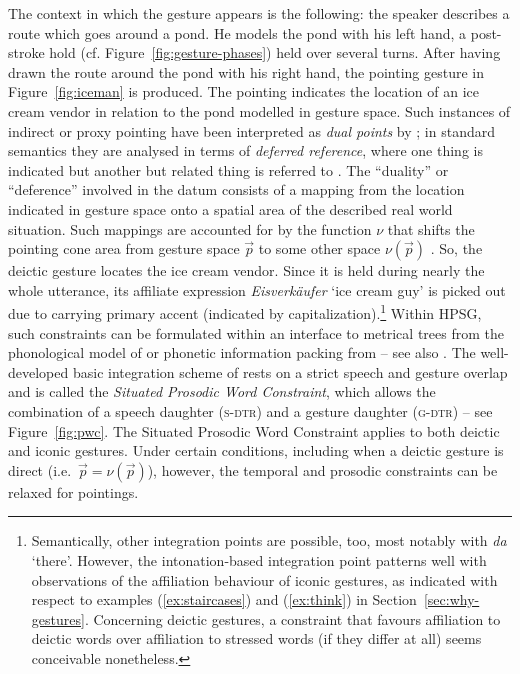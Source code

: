 \documentclass[output=paper
 	        ,biblatex
                ,babelshorthands
                ,newtxmath
                ,draftmode
                ,colorlinks, citecolor=brown
]{langscibook}
\begin{document}
\noindent The context in which the gesture appears is the following: the speaker describes a route which goes around a pond. 
%
He models the pond with his left hand, a post-stroke hold (cf. Figure~\ref{fig:gesture-phases}) held over several turns.
%
After having drawn the route around the pond with his right hand, the pointing gesture in Figure~\ref{fig:iceman} is produced.
%
The pointing indicates the location of an ice cream vendor in relation to the pond modelled in gesture space. 
%
Such instances of indirect or proxy pointing have been interpreted as \emph{dual points} by \citet{Goodwin:2003}; in standard semantics they are analysed in terms of \emph{deferred reference}, where one thing is indicated but another but related thing is referred to \citep{Quine:1950,Nunberg:1993}. 
%
The \enquote{duality} or \enquote{deference} involved in the datum consists of a mapping from the location indicated in gesture space onto a spatial area of the described real world situation.
%
Such mappings are accounted for by the function $\nu$ that shifts the pointing cone area from gesture space $\vec{p}$ to some other space $\nu(\vec{p})$ \citep{Lascarides:Stone:2009:a}.
%
So, the deictic gesture locates the ice cream vendor. 
%
Since it is held during nearly the whole utterance, its affiliate expression \emph{Eisverkäufer} \enquote*{ice cream guy} is picked out due to carrying primary accent (indicated by capitalization).\footnote{Semantically, other integration points are possible, too, most notably with \emph{da} \enquote*{there}. However, the intonation-based integration point patterns well with observations of the affiliation behaviour of iconic gestures, as indicated with respect to examples (\ref{ex:staircases}) and (\ref{ex:think}) in Section~\ref{sec:why-gestures}. Concerning deictic gestures, a constraint that favours affiliation to deictic words over affiliation to stressed words (if they differ at all) seems conceivable nonetheless.}
%
Within HPSG, such constraints can be formulated within an interface to metrical trees from the phonological model of \citet{Klein:2000} or phonetic information packing from \citet{Engdahl:Vallduvi:1996} -- see also .
%
The well-developed basic integration scheme of \citet[]{Alahverdzhieva:Lascarides:Flickinger:2017} rests on a strict speech and gesture overlap and is called the \emph{Situated Prosodic Word Constraint}, which allows the combination of a speech daughter (\textsc{s-dtr})  and a gesture daughter (\textsc{g-dtr})  -- see Figure~\ref{fig:pwc}.
%
The Situated Prosodic Word Constraint applies to both deictic and iconic gestures.
%
Under certain conditions, including when a deictic gesture is direct (i.e.\ $\vec{p} = \nu(\vec{p})$), however, the temporal and prosodic constraints can be relaxed for pointings.  
\end{document}
